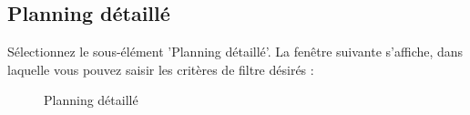 \vspace{5cm} 








\subsection{Planning détaillé}

Sélectionnez le sous-élément 'Planning détaillé'. La fenêtre suivante s'affiche, dans laquelle vous pouvez saisir les critères de filtre désirés :

\begin{figure}[H]
\caption{Planning détaillé}
\end{figure}


